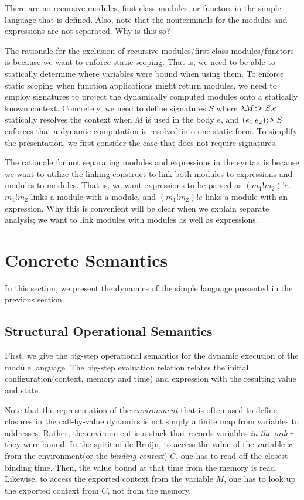 \documentclass[acmsmall,screen,review]{acmart}
\theoremstyle{definition}
\newcommand*{\link}[2]{{#1}\mathtt{!}{#2}}
\newcommand*{\project}{\text{\texttt{:>} }}
\begin{document}
There are no recursive modules, first-class modules, or functors in the simple language that is defined.
Also, note that the nonterminals for the modules and expressions are not separated. Why is this so?

The rationale for the exclusion of recursive modules/first-class modules/functors is because we want to enforce static scoping.
That is, we need to be able to statically determine where variables were bound when using them.
To enforce static scoping when function applications might return modules, we need to employ signatures to project the dynamically computed modules onto a statically known context.
Concretely, we need to define signatures $S$ where $\lambda M\project S.e$ statically resolves the context when $M$ is used in the body $e$, and $(e_1\:e_2)\project S$ enforces that a dynamic computation is resolved into one static form.
To simplify the presentation, we first consider the case that does not require signatures.

The rationale for not separating modules and expressions in the syntax is because we want to utilize the linking construct to link both modules to expressions and modules to modules.
That is, we want expressions to be parsed as $(m_1!m_2)!e$.
$\link{m_1}{m_2}$ links a module with a module, and $(m_1!m_2)!e$ links a module with an expression.
Why this is convenient will be clear when we explain separate analysis; we want to link modules with modules as well as expressions.

\section{Concrete Semantics}

In this section, we present the dynamics of the simple language presented in the previous section.

\subsection{Structural Operational Semantics}

First, we give the big-step operational semantics for the dynamic execution of the module language.
The big-step evaluation relation relates the initial configuration(context, memory and time) and expression with the resulting value and state.

Note that the representation of the \emph{environment} that is often used to define closures in the call-by-value dynamics is not simply a finite map from variables to addresses.
Rather, the environment is a stack that records variables \emph{in the order} they were bound.
In the spirit of de Bruijn, to access the value of the variable $x$ from the environment(or the \emph{binding context}) $C$, one has to read off the closest binding time.
Then, the value bound at that time from the memory is read.
Likewise, to access the exported context from the variable $M$, one has to look up the exported context from $C$, not from the memory.
\end{document}
